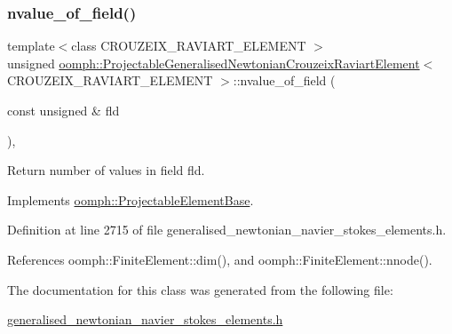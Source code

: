 \subsubsection{\texorpdfstring{nvalue\+\_\+of\+\_\+field()}{nvalue\_of\_field()}}
{\footnotesize\ttfamily template$<$class C\+R\+O\+U\+Z\+E\+I\+X\+\_\+\+R\+A\+V\+I\+A\+R\+T\+\_\+\+E\+L\+E\+M\+E\+NT $>$ \\
unsigned \hyperlink{classoomph_1_1ProjectableGeneralisedNewtonianCrouzeixRaviartElement}{oomph\+::\+Projectable\+Generalised\+Newtonian\+Crouzeix\+Raviart\+Element}$<$ C\+R\+O\+U\+Z\+E\+I\+X\+\_\+\+R\+A\+V\+I\+A\+R\+T\+\_\+\+E\+L\+E\+M\+E\+NT $>$\+::nvalue\+\_\+of\+\_\+field (\begin{DoxyParamCaption}\item[{const unsigned \&}]{fld }\end{DoxyParamCaption})\hspace{0.3cm}{\ttfamily [inline]}, {\ttfamily [virtual]}}



Return number of values in field fld. 



Implements \hyperlink{classoomph_1_1ProjectableElementBase_a1a9a6de16f3511bca8e8be770abb9c2e}{oomph\+::\+Projectable\+Element\+Base}.



Definition at line 2715 of file generalised\+\_\+newtonian\+\_\+navier\+\_\+stokes\+\_\+elements.\+h.



References oomph\+::\+Finite\+Element\+::dim(), and oomph\+::\+Finite\+Element\+::nnode().



The documentation for this class was generated from the following file\+:\begin{DoxyCompactItemize}
\item 
\hyperlink{generalised__newtonian__navier__stokes__elements_8h}{generalised\+\_\+newtonian\+\_\+navier\+\_\+stokes\+\_\+elements.\+h}\end{DoxyCompactItemize}
